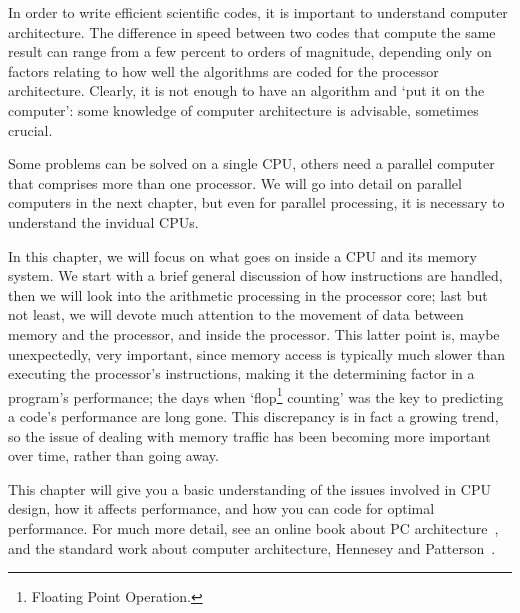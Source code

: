 
In order to write efficient scientific codes, it is important to
understand computer architecture. The difference in speed between two
codes that compute the same result can range from a few percent to
orders of magnitude, depending only on factors relating to how well
the algorithms are coded for the processor architecture. Clearly, it
is not enough to have an algorithm and `put it on the computer': some
knowledge of computer architecture is advisable, sometimes crucial.

Some
problems can be solved on a single CPU, others need a parallel
computer that comprises more than one processor. We will go into
detail on parallel computers in the next chapter, but even for
parallel processing, it is necessary to understand the invidual CPUs.

In this chapter, we will focus on what goes on inside a CPU and its
memory system. We start with a brief general discussion of how
instructions are handled, then we will look into the arithmetic
processing in the processor core; last but not least, we will devote
much attention to the movement of data between memory and the
processor, and inside the processor. This latter point is, maybe
unexpectedly, very important, since memory access is typically much
slower than executing the processor's instructions, making it the
determining factor in a program's performance; the days when
`flop\footnote{Floating Point Operation.}  counting' was the key to
predicting a code's performance are long gone. This discrepancy is in
fact a growing trend, so the issue of dealing with memory traffic has
been becoming more important over time, rather than going away.

This chapter will give you a basic understanding of the issues
involved in CPU design, how it affects performance, and how you can
code for optimal performance. For much more detail, see 
an online book about PC
architecture~\cite{Karbo:book},
and the standard work about computer architecture, Hennesey and
Patterson~\cite{HennessyPatterson}. 

